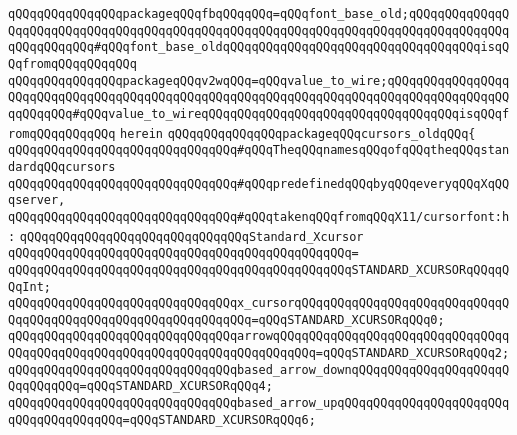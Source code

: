 \verb|qQQqqQQqqQQqqQQqpackageqQQqfbqQQqqQQq=qQQqfont_base_old;qQQqqQQqqQQqqQQqqQQqqQQqqQQqqQQqqQQqqQQqqQQqqQQqqQQqqQQqqQQqqQQqqQQqqQQqqQQqqQQqqQQqqQQqqQQqqQQq#qQQqfont_base_oldqQQqqQQqqQQqqQQqqQQqqQQqqQQqqQQqqQQqisqQQqfromqQQqqQQqqQQq|\newline
\verb|qQQqqQQqqQQqqQQqpackageqQQqv2wqQQq=qQQqvalue_to_wire;qQQqqQQqqQQqqQQqqQQqqQQqqQQqqQQqqQQqqQQqqQQqqQQqqQQqqQQqqQQqqQQqqQQqqQQqqQQqqQQqqQQqqQQqqQQqqQQq#qQQqvalue_to_wireqQQqqQQqqQQqqQQqqQQqqQQqqQQqqQQqqQQqisqQQqfromqQQqqQQqqQQq|\newline
\verb|herein|\newline
\newline
\verb|qQQqqQQqqQQqqQQqpackageqQQqcursors_oldqQQq{|\newline
\newline
\verb|qQQqqQQqqQQqqQQqqQQqqQQqqQQqqQQq#qQQqTheqQQqnamesqQQqofqQQqtheqQQqstandardqQQqcursors|\newline
\verb|qQQqqQQqqQQqqQQqqQQqqQQqqQQqqQQq#qQQqpredefinedqQQqbyqQQqeveryqQQqXqQQqserver,|\newline
\verb|qQQqqQQqqQQqqQQqqQQqqQQqqQQqqQQq#qQQqtakenqQQqfromqQQqX11/cursorfont:h:|\newline
\newline
\verb|qQQqqQQqqQQqqQQqqQQqqQQqqQQqqQQqStandard_Xcursor|\newline
\verb|qQQqqQQqqQQqqQQqqQQqqQQqqQQqqQQqqQQqqQQqqQQqqQQq=|\newline
\verb|qQQqqQQqqQQqqQQqqQQqqQQqqQQqqQQqqQQqqQQqqQQqqQQqSTANDARD_XCURSORqQQqqQQqInt;|\newline
\newline
\verb|qQQqqQQqqQQqqQQqqQQqqQQqqQQqqQQqx_cursorqQQqqQQqqQQqqQQqqQQqqQQqqQQqqQQqqQQqqQQqqQQqqQQqqQQqqQQqqQQqqQQq=qQQqSTANDARD_XCURSORqQQq0;|\newline
\verb|qQQqqQQqqQQqqQQqqQQqqQQqqQQqqQQqarrowqQQqqQQqqQQqqQQqqQQqqQQqqQQqqQQqqQQqqQQqqQQqqQQqqQQqqQQqqQQqqQQqqQQqqQQqqQQq=qQQqSTANDARD_XCURSORqQQq2;|\newline
\verb|qQQqqQQqqQQqqQQqqQQqqQQqqQQqqQQqbased_arrow_downqQQqqQQqqQQqqQQqqQQqqQQqqQQqqQQq=qQQqSTANDARD_XCURSORqQQq4;|\newline
\verb|qQQqqQQqqQQqqQQqqQQqqQQqqQQqqQQqbased_arrow_upqQQqqQQqqQQqqQQqqQQqqQQqqQQqqQQqqQQqqQQq=qQQqSTANDARD_XCURSORqQQq6;|\newline
